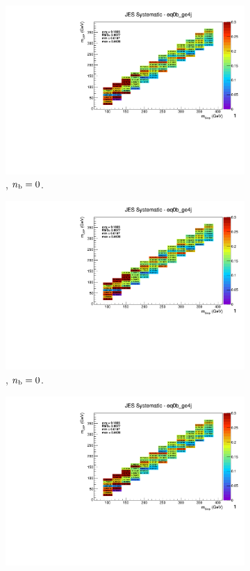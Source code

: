 \begin{figure}[ht!]
\begin{subfigure}[b]{0.32\textwidth}
    \includegraphics[width=\textwidth, page=12]{Figs/sms/t2degen/v19/systs_v2/T2_4body_JES_eq0b_ge4j.pdf}
    \caption{\njhigh, $n_{\text{b}} = 0$.}
  \end{subfigure}
  \begin{subfigure}[b]{0.32\textwidth}
    \includegraphics[width=\textwidth, page=8]{Figs/sms/t2degen/v19/systs_v2/T2_4body_JES_eq0b_ge4j.pdf}
    \caption{\njhigh, $n_{\text{b}} = 0$.}
  \end{subfigure}
  \begin{subfigure}[b]{0.32\textwidth}
    \includegraphics[width=\textwidth, page=1]{Figs/sms/t2degen/v19/systs_v2/T2_4body_JES_eq0b_ge4j.pdf}

\end{subfigure}
\end{figure}
